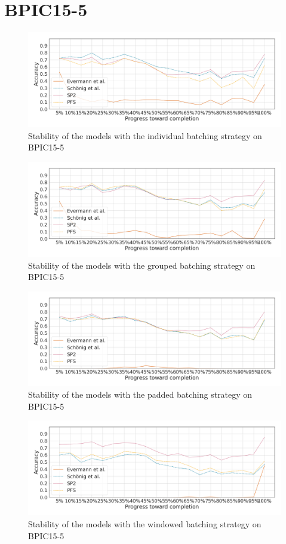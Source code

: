 \section*{BPIC15-5}
\begin{figure}[!htb]
    \centering
    \includegraphics[width=\textwidth]{gfx/bpic2015_5/individual_stability.png}
    \caption{Stability of the models with the individual batching strategy on BPIC15-5}
    \label{fig:bpic15-5-individual-stability}
\end{figure}
\begin{figure}[!htb]
    \centering
    \includegraphics[width=\textwidth]{gfx/bpic2015_5/grouped_stability.png}
    \caption{Stability of the models with the grouped batching strategy on BPIC15-5}
    \label{fig:bpic15-5-grouped-stability}
\end{figure}
\begin{figure}[!htb]
    \centering
    \includegraphics[width=\textwidth]{gfx/bpic2015_5/padded_stability.png}
    \caption{Stability of the models with the padded batching strategy on BPIC15-5}
    \label{fig:bpic15-5-padded-stability}
\end{figure}
\begin{figure}[!htb]
    \centering
    \includegraphics[width=\textwidth]{gfx/bpic2015_5/windowed_stability.png}
    \caption{Stability of the models with the windowed batching strategy on BPIC15-5}
    \label{fig:bpic15-5-windowed-stability}
\end{figure}
